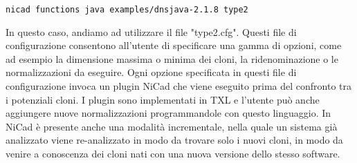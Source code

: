 \begin{center}
\verb|nicad functions java examples/dnsjava-2.1.8 type2|
\end{center}

In questo caso, andiamo ad utilizzare il file "type2.cfg".
Questi file di configurazione consentono all'utente di specificare una gamma di opzioni, come ad esempio la dimensione massima o minima dei cloni, la ridenominazione o le normalizzazioni da eseguire. Ogni opzione specificata in questi file di configurazione invoca un plugin NiCad che viene eseguito prima del confronto tra i potenziali cloni. I plugin sono implementati in TXL e l'utente può anche aggiungere nuove normalizzazioni programmandole con questo linguaggio.
In NiCad è presente anche una modalità incrementale, nella quale un sistema già analizzato viene re-analizzato in modo da trovare solo i nuovi cloni, in modo da venire a conoscenza dei cloni nati con una nuova versione dello stesso software.





